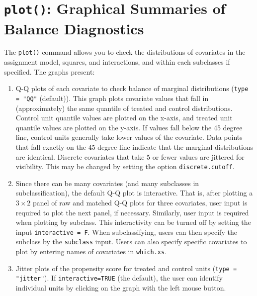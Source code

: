 \section{\texttt{plot()}: Graphical Summaries of Balance Diagnostics}

The \texttt{plot()} command allows you to check the distributions of
covariates in the assignment model, squares, and interactions, and
within each subclasses if specified.  The graphs present:
\begin{enumerate}
\item Q-Q plots of each covariate to check balance of marginal
  distributions (\texttt{type = "QQ"} (default)).  This graph plots
  covariate values that fall in (approximately) the same quantile of
  treated and control distributions.  Control unit quantile values are
  plotted on the x-axis, and treated unit quantile values are plotted
  on the y-axis.  If values fall below the 45 degree line, control
  units generally take lower values of the covariate.  Data points
  that fall exactly on the 45 degree line indicate that the marginal
  distributions are identical.  Discrete covariates that take 5 or
  fewer values are jittered for visibility.  This may be changed by
  setting the option \texttt{discrete.cutoff}.  

\item Since there can be many covariates (and many subclasses in
  subclassification), the default Q-Q plot is interactive.  That is,
  after plotting a $3 \times 2$ panel of raw and matched Q-Q plots for
  three covariates, user input is required to plot the next panel, if
  necessary.  Similarly, user input is required when plotting by
  subclass.  This interactivity can be turned off by setting the input
  \texttt{interactive = F}.  When subclassifying, users can then
  specify the subclass by the \texttt{subclass} input.  Users can also
  specify specific covariates to plot by entering names of covariates
  in \texttt{which.xs}.

\item Jitter plots of the propensity score for treated and control
  units (\texttt{type = "jitter"}).  If \texttt{interactive=TRUE} (the
  default), the user can identify individual units by clicking on the
  graph with the left mouse button.
\end{enumerate}

